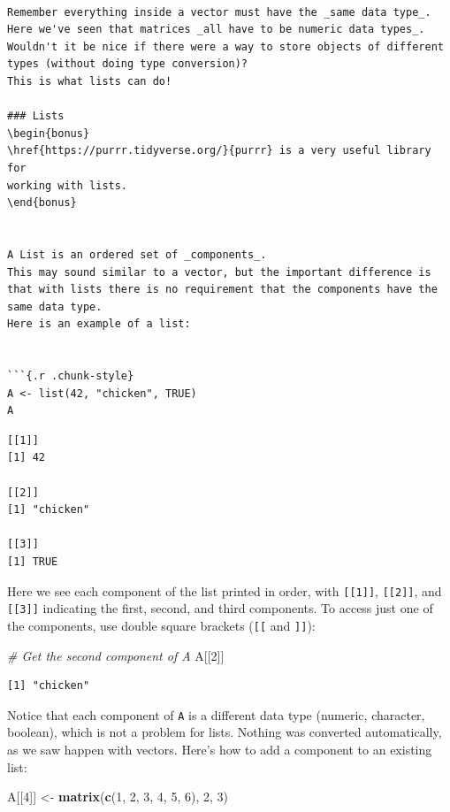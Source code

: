 \documentclass[
]{article}
\newenvironment{Shaded}{\begin{snugshade}}{\end{snugshade}}
\newcommand{\CommentTok}[1]{\textcolor[rgb]{0.56,0.35,0.01}{\textit{#1}}}
\newcommand{\DecValTok}[1]{\textcolor[rgb]{0.00,0.00,0.81}{#1}}
\newcommand{\KeywordTok}[1]{\textcolor[rgb]{0.13,0.29,0.53}{\textbf{#1}}}
\newcommand{\NormalTok}[1]{#1}
\newcommand{\StringTok}[1]{\textcolor[rgb]{0.31,0.60,0.02}{#1}}
\newenvironment{bonus}{
  \specialblock{bonus}{sun-fill.png}{Bonus}
}{\endspecialblock}
\begin{document}
\begin{verbatim}

Remember everything inside a vector must have the _same data type_.
Here we've seen that matrices _all have to be numeric data types_.
Wouldn't it be nice if there were a way to store objects of different types (without doing type conversion)?
This is what lists can do!

### Lists
\begin{bonus}
\href{https://purrr.tidyverse.org/}{purrr} is a very useful library for
working with lists.
\end{bonus}


A List is an ordered set of _components_.
This may sound similar to a vector, but the important difference is that with lists there is no requirement that the components have the same data type. 
Here is an example of a list:


```{.r .chunk-style}
A <- list(42, "chicken", TRUE)
A
\end{verbatim}

\begin{verbatim}
[[1]]
[1] 42

[[2]]
[1] "chicken"

[[3]]
[1] TRUE
\end{verbatim}

Here we see each component of the list printed in order, with \texttt{{[}{[}1{]}{]}}, \texttt{{[}{[}2{]}{]}}, and \texttt{{[}{[}3{]}{]}} indicating the first, second, and third components.
To access just one of the components, use double square brackets (\texttt{{[}{[}} and \texttt{{]}{]}}):

\begin{Shaded}
\begin{Highlighting}[]
\CommentTok{# Get the second component of A}
\NormalTok{A[[}\DecValTok{2}\NormalTok{]]}
\end{Highlighting}
\end{Shaded}

\begin{verbatim}
[1] "chicken"
\end{verbatim}

Notice that each component of \texttt{A} is a different data type (numeric, character, boolean), which is not a problem for lists.
Nothing was converted automatically, as we saw happen with vectors.
Here's how to add a component to an existing list:

\begin{Shaded}
\begin{Highlighting}[]
\NormalTok{A[[}\DecValTok{4}\NormalTok{]] <-}\StringTok{ }\KeywordTok{matrix}\NormalTok{(}\KeywordTok{c}\NormalTok{(}\DecValTok{1}\NormalTok{, }\DecValTok{2}\NormalTok{, }\DecValTok{3}\NormalTok{, }\DecValTok{4}\NormalTok{, }\DecValTok{5}\NormalTok{, }\DecValTok{6}\NormalTok{), }\DecValTok{2}\NormalTok{, }\DecValTok{3}\NormalTok{)}
\end{Highlighting}
\end{Shaded}
\end{document}
